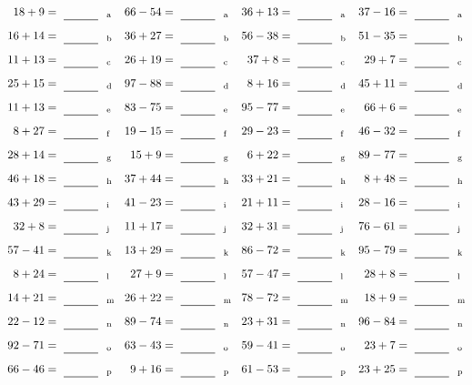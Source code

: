 \documentclass
[
  draft    = true,
  fontsize = 11pt,
  parskip  = half-
]
{scrartcl}
\begin{document}
\clearpage
\begin{align*}
    \pline{18+9}&=\rline{a}
  & \pline{66-54}&=\rline{a}
  & \pline{36+13}&=\rline{a}
  & \pline{37-16}&=\rline{a} \\[1ex]
    \pline{16+14}&=\rline{b}
  & \pline{36+27}&=\rline{b}
  & \pline{56-38}&=\rline{b}
  & \pline{51-35}&=\rline{b} \\[1ex]
    \pline{11+13}&=\rline{c}
  & \pline{26+19}&=\rline{c}
  & \pline{37+8}&=\rline{c}
  & \pline{29+7}&=\rline{c} \\[1ex]
    \pline{25+15}&=\rline{d}
  & \pline{97-88}&=\rline{d}
  & \pline{8+16}&=\rline{d}
  & \pline{45+11}&=\rline{d} \\[1ex]
    \pline{11+13}&=\rline{e}
  & \pline{83-75}&=\rline{e}
  & \pline{95-77}&=\rline{e}
  & \pline{66+6}&=\rline{e} \\[1ex]
    \pline{8+27}&=\rline{f}
  & \pline{19-15}&=\rline{f}
  & \pline{29-23}&=\rline{f}
  & \pline{46-32}&=\rline{f} \\[1ex]
    \pline{28+14}&=\rline{g}
  & \pline{15+9}&=\rline{g}
  & \pline{6+22}&=\rline{g}
  & \pline{89-77}&=\rline{g} \\[1ex]
    \pline{46+18}&=\rline{h}
  & \pline{37+44}&=\rline{h}
  & \pline{33+21}&=\rline{h}
  & \pline{8+48}&=\rline{h} \\[1ex]
    \pline{43+29}&=\rline{i}
  & \pline{41-23}&=\rline{i}
  & \pline{21+11}&=\rline{i}
  & \pline{28-16}&=\rline{i} \\[1ex]
    \pline{32+8}&=\rline{j}
  & \pline{11+17}&=\rline{j}
  & \pline{32+31}&=\rline{j}
  & \pline{76-61}&=\rline{j} \\[1ex]
    \pline{57-41}&=\rline{k}
  & \pline{13+29}&=\rline{k}
  & \pline{86-72}&=\rline{k}
  & \pline{95-79}&=\rline{k} \\[1ex]
    \pline{8+24}&=\rline{l}
  & \pline{27+9}&=\rline{l}
  & \pline{57-47}&=\rline{l}
  & \pline{28+8}&=\rline{l} \\[1ex]
    \pline{14+21}&=\rline{m}
  & \pline{26+22}&=\rline{m}
  & \pline{78-72}&=\rline{m}
  & \pline{18+9}&=\rline{m} \\[1ex]
    \pline{22-12}&=\rline{n}
  & \pline{89-74}&=\rline{n}
  & \pline{23+31}&=\rline{n}
  & \pline{96-84}&=\rline{n} \\[1ex]
    \pline{92-71}&=\rline{o}
  & \pline{63-43}&=\rline{o}
  & \pline{59-41}&=\rline{o}
  & \pline{23+7}&=\rline{o} \\[1ex]
    \pline{66-46}&=\rline{p}
  & \pline{9+16}&=\rline{p}
  & \pline{61-53}&=\rline{p}
  & \pline{23+25}&=\rline{p}
\end{align*}
\end{document}
